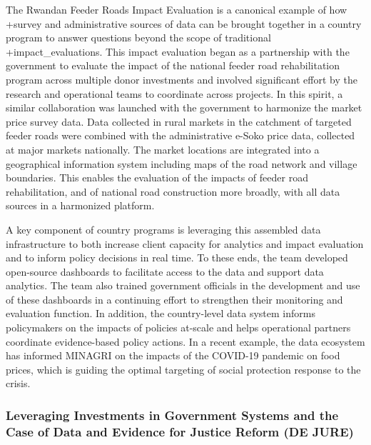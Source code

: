 \documentclass[
]{book}
\begin{document}
The Rwandan Feeder Roads Impact Evaluation is a canonical example of how +survey\textbar{} and administrative sources of data can be brought together in a country program to answer questions beyond the scope of traditional +impact\_evaluations\textbar. This impact evaluation began as a partnership with the government to evaluate the impact of the national feeder road rehabilitation program across multiple donor investments and involved significant effort by the research and operational teams to coordinate across projects. In this spirit, a similar collaboration was launched with the government to harmonize the market price survey data. Data collected in rural markets in the catchment of targeted feeder roads were combined with the administrative e-Soko price data, collected at major markets nationally. The market locations are integrated into a geographical information system including maps of the road network and village boundaries. This enables the evaluation of the impacts of feeder road rehabilitation, and of national road construction more broadly, with all data sources in a harmonized platform.

A key component of country programs is leveraging this assembled data infrastructure to both increase client capacity for analytics and impact evaluation and to inform policy decisions in real time. To these ends, the team developed open-source dashboards to facilitate access to the data and support data analytics. The team also trained government officials in the development and use of these dashboards in a continuing effort to strengthen their monitoring and evaluation function. In addition, the country-level data system informs policymakers on the impacts of policies at-scale and helps operational partners coordinate evidence-based policy actions. In a recent example, the data ecosystem has informed MINAGRI on the impacts of the COVID-19 pandemic on food prices, which is guiding the optimal targeting of social protection response to the crisis.

\hypertarget{leveraging-investments-in-government-systems-and-the-case-of-data-and-evidence-for-justice-reform-de-jure}{%
\subsubsection{Leveraging Investments in Government Systems and the Case of Data and Evidence for Justice Reform (DE JURE)}\label{leveraging-investments-in-government-systems-and-the-case-of-data-and-evidence-for-justice-reform-de-jure}}
\end{document}
